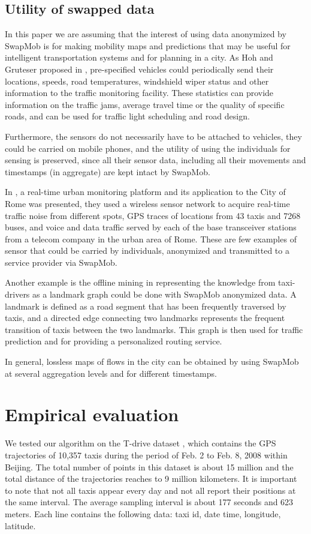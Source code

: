 \documentclass{llncs}
\begin{document}
\subsection{Utility of swapped data}\label{sect:util}
In this paper we are assuming that the interest of using data anonymized by SwapMob is for making mobility maps and predictions that may be useful for intelligent transportation systems and for planning in a city.
As Hoh and Gruteser proposed in \cite{Hoh2005}, pre-specified vehicles could periodically send their locations, speeds, road temperatures, windshield wiper status and other information to the traffic monitoring facility. These statistics can provide information on the traffic jams, average travel time or the quality of specific roads, and can be used for traffic light scheduling and road design.

Furthermore, the sensors do not necessarily have to be attached to vehicles, they could be carried on mobile phones, and the utility of using the individuals for sensing is preserved, since all their sensor data, including all their movements and timestamps (in aggregate) are kept intact by SwapMob.


In \cite{Calabrese2011}, a real-time urban monitoring platform and its application to the City of Rome was presented, they used
a wireless sensor network to acquire real-time traffic noise from different spots, GPS traces of locations from 43 taxis and 7268 buses, and voice and data traffic served by each of the base transceiver stations from a telecom company in the urban area of Rome. These are few examples of sensor that could be carried by individuals, anonymized and transmitted to a service provider via SwapMob.


Another example is the offline mining in \cite{Yuan2011} representing the knowledge from taxi-drivers as a landmark graph could be done with SwapMob anonymized data. A landmark is defined as a road segment that has been frequently traversed by taxis, and a directed edge connecting two landmarks represents the frequent transition of taxis between the two landmarks. This graph is then used for traffic prediction and for providing a personalized routing service.


In general, lossless maps of flows in the city can be obtained by using SwapMob at several aggregation levels and for different timestamps.



\section{Empirical evaluation}
We tested our algorithm on the T-drive dataset \cite{Yuan2010},\cite{Yuan2011} which contains the GPS trajectories of 10,357 taxis during the period of Feb. 2 to Feb. 8, 2008 within Beijing. The total number of points in this dataset is about 15 million and the total distance of the trajectories reaches to 9 million kilometers.
It is important to note that not all taxis appear every day and not all report their positions at the same interval.
The average sampling interval is about 177 seconds and 623 meters.
Each line contains the following data: taxi id, date time, longitude, latitude.
\end{document}
